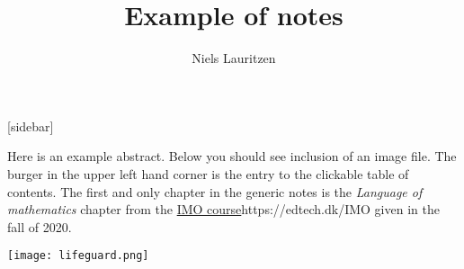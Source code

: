 \documentclass{article}
\title{Example of notes}
\author{Niels Lauritzen}
\begin{document}
[sidebar]

\maketitle

\vspace{2cm}

\begin{changemargin}{3cm}{3cm}
  Here is an example abstract. Below you should see inclusion of
  an image file. The burger in the upper left hand corner is the entry
  to the clickable table of contents. The first and only chapter in the generic notes is the \emph{Language of mathematics} chapter from  the \url{IMO course}{https://edtech.dk/IMO} given in the fall of 2020.
\end{changemargin}



\texttt{[image: lifeguard.png]}
\end{document}
